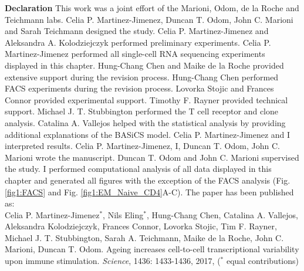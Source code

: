 \begin{Comment}
\textbf{Declaration} This work was a joint effort of the Marioni, Odom, de la Roche and Teichmann labs. Celia P. Martinez-Jimenez, Duncan T. Odom, John C. Marioni and Sarah Teichmann designed the study. Celia P. Martinez-Jimenez and Aleksandra A. Kolodziejczyk performed preliminary experiments. Celia P. Martinez-Jimenez performed all single-cell RNA sequencing experiments displayed in this chapter. Hung-Chang Chen and Maike de la Roche provided extensive support during the revision process. Hung-Chang Chen performed FACS experiments during the revision process. Lovorka Stojic and Frances Connor provided experimental support. Timothy F. Rayner provided technical support. Michael J. T. Stubbington performed the T cell receptor and clone analysis. Catalina A. Vallejos helped with the statistical analysis by providing additional explanations of the BASiCS model. Celia P. Martinez-Jimenez and I interpreted results. Celia P. Martinez-Jimenez, I, Duncan T. Odom, John C. Marioni wrote the manuscript. Duncan T. Odom and John C. Marioni supervised the study. I performed computational analysis of all data displayed in this chapter and generated all figures with the exception of the FACS analysis (Fig. \ref{fig1:FACS} and Fig. \ref{fig1:EM_Naive_CD4}A-C). The paper has been published as:\\

Celia P. Martinez-Jimenez$^\ast$, Nils  Eling$^\ast$, Hung-Chang Chen, Catalina A. Vallejos, Aleksandra Kolodziejczyk, Frances Connor, Lovorka Stojic, Tim F. Rayner, Michael J. T. Stubbington, Sarah A. Teichmann, Maike de la Roche, John C. Marioni, Duncan T. Odom. Ageing increases cell-to-cell transcriptional variability upon immune stimulation. \emph{Science}, 1436: 1433-1436, 2017, ($^\ast$ equal contributions)
\end{Comment}

\vspace*{\fill}

\newpage


\newpage

\newpage

